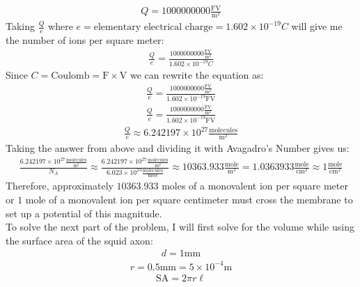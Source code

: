 \documentclass[11pt]{article}
\begin{document}
\begin{enumerate}[label=\arabic*.]
\begin{align*}
\end{align*}
\begin{align*}
Q = 1000000000 \frac{\text{FV}} {\text{m}^2}
\end{align*}
Taking $\frac{Q} {e}$ where $e = \text{elementary electrical charge} = 1.602 \times 10^{-19} C$ will give me the number of ions per square meter:
\begin{align*}
\frac{Q} {e} = \frac{1000000000 \frac{\text{FV}} {\text{m}^2}} {1.602 \times 10^{-19} C}
\end{align*}
Since $C = \text{Coulomb} = \text{F} \times \text{V}$ we can rewrite the equation as:
\begin{align*}
\frac{Q} {e} = \frac{1000000000 \frac{\text{FV}} {\text{m}^2}} {1.602 \times 10^{-19} \text{FV}}
\end{align*}
\begin{align*}
\frac{Q} {e} = \frac{1000000000 \frac{\text{FV}} {\text{m}^2}} {1.602 \times 10^{-19} \text{FV}}
\end{align*}
\begin{align*}
\frac{Q} {e} \approx 6.242197 \times 10^{27} \frac{\text{molecules}} {\text{m}^2}
\end{align*}
Taking the answer from above and dividing it with Avagadro's Number gives us:
\begin{align*}
\frac{6.242197 \times 10^{27} \frac{\text{molecules}} {\text{m}^2}} {N_A} \approx \frac{6.242197 \times 10^{27} \frac{\text{molecules}} {\text{m}^2}} {6.023 \times 10^{23} \frac{\text{molecules}} {\text{mole}}} \approx 10363.933 \frac{\text{mole}} {\text{m}^2} = 1.0363933 \frac{\text{mole}} {\text{cm}^2} \approx 1 \frac{\text{mole}} {\text{cm}^2}
\end{align*}
Therefore, approximately $10363.933$ moles of a monovalent ion per square meter or $1$ mole of a monovalent ion per square centimeter must cross the membrane to set up a potential of this magnitude.
\vspace*{1\baselineskip}
\\
To solve the next part of the problem, I will first solve for the volume while using the surface area of the squid axon:
\begin{align*}
d = 1 \text{mm}
\end{align*}
\begin{align*}
r = 0.5 \text{mm} = 5 \times 10^{-4} \text{m}
\end{align*}
\begin{align*}
\text{SA} = 2 \pi r \ell
\end{align*}

\end{enumerate}
\end{document}
